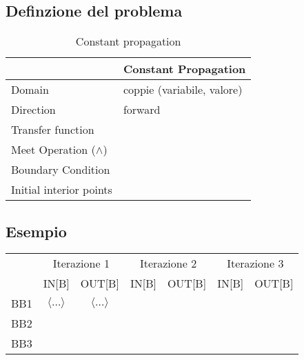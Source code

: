 \documentclass[10pt,a4paper]{article}
\begin{document}
\subsection{Definzione del problema}

\begin{table}[h!]
  \centering
  \begin{tabular}{|l|p{4cm}|}
    \hline
    \textbf{} & \textbf{Constant Propagation} \\
    \hline
    Domain & coppie (variabile, valore)\\
    \hline
    Direction & forward \\
    \hline
    Transfer function &  \\
    \hline
    Meet Operation (\(\land\)) & \\
    \hline
    Boundary Condition & \\
    \hline
    Initial interior points & \\
    \hline
  \end{tabular}
  \caption{Constant propagation}
\end{table}

\subsection{Esempio}
\begin{table}[h!]
\centering
\renewcommand{\arraystretch}{1.5}
\begin{tabular}{|c|c|c|c|c|c|c|}
\hline
\rowcolor{blue!30}
 & \multicolumn{2}{c|}{Iterazione 1} & \multicolumn{2}{c|}{Iterazione 2} & \multicolumn{2}{c|}{Iterazione 3} \\
\rowcolor{blue!30}
 & IN[B] & OUT[B] & IN[B] & OUT[B] & IN[B] & OUT[B] \\
\hline
BB1 & $\langle \ldots \rangle$ & $\langle \ldots \rangle$ & & & & \\
\hline
BB2 & & & & & & \\
\hline
BB3 & & & & & & \\
\hline
\end{tabular}
\end{table}
\end{document}
